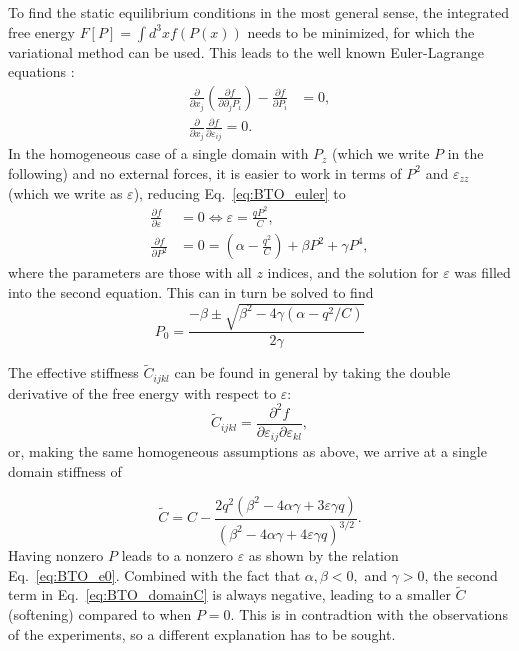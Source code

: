 To find the static equilibrium conditions in the most general sense, the integrated free energy $F[P] = \int d^3x f(P(x))$ needs to be minimized, for which the variational method can be used.
This leads to the well known Euler-Lagrange equations \cite{Cao1991, Marton2010}:
\begin{align}
	\label{eq:BTO_euler}
	\frac{\partial}{\partial x_j}\left( \frac{\partial f}{\partial \partial_j P_i}\right) - \frac{\partial f}{\partial P_i} &= 0, \\
	\frac{\partial}{\partial x_j}\frac{\partial f}{\partial \varepsilon_{ij}} = 0.
\end{align}
In the homogeneous case of a single domain with $P_z$ (which we write $P$ in the following) and no external forces, it is easier to work in terms of $P^2$ and $\varepsilon_{zz}$ (which we write as $\varepsilon$), reducing Eq.~\ref{eq:BTO_euler} to  
\begin{align}
	\frac{\partial f}{\partial \varepsilon} &= 0 \Leftrightarrow \varepsilon = \frac{qP^2}{C}\label{eq:BTO_e0},\\
	\frac{\partial f}{\partial P^2} &= 0 = \left(\alpha - \frac{q^2}{C}\right) + \beta P^2 + \gamma P^4,
\end{align}
where the parameters are those with all $z$ indices, and the solution for $\varepsilon$ was filled into the second equation.
This can in turn be solved to find
\begin{equation}
	P_0 = \frac{-\beta \pm \sqrt{\beta^2 - 4\gamma (\alpha - q^2/C)}}{2\gamma}
\end{equation}

The effective stiffness $\tilde{C}_{ijkl}$ can be found in general by taking the double derivative of the free energy with respect to $\varepsilon$:
\begin{equation}
	\tilde{C}_{ijkl} = \frac{\partial^2 f}{\partial \varepsilon_{ij} \partial \varepsilon_{kl}},
\end{equation}
or, making the same homogeneous assumptions as above, we arrive at a single domain stiffness of

\begin{equation}
	\tilde{C} = C - \frac{2q^2\left(\beta^2-4\alpha\gamma + 3 \varepsilon \gamma q\right)}{\left(\beta^2 - 4 \alpha \gamma + 4 \varepsilon \gamma q\right)^{3/2}}\label{eq:BTO_domainC}.
\end{equation}
Having nonzero $P$ leads to a nonzero $\varepsilon$ as shown by the relation Eq.~\ref{eq:BTO_e0}.
Combined with the fact that $\alpha,\beta < 0,$ and $\gamma > 0$, the second term in Eq.~\ref{eq:BTO_domainC} is always negative, leading to a smaller $\tilde{C}$ (softening) compared to when $P=0$. 
This is in contradtion with the observations of the experiments, so a different explanation has to be sought.


